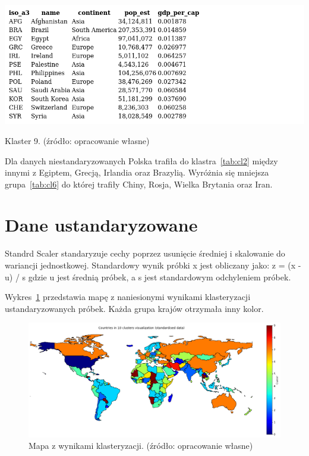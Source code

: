 \documentclass[11pt]{report}
\begin{document}
    \begin{table}[!htp]
        \centering
        \includegraphics[width=\linewidth]{tables/CLUST/clust9kmeans.png}
        \caption{Klaster 9. (źródło: opracowanie własne)}
        \label{tab:cl9}
    \end{table}

    Dla danych niestandaryzowanych Polska trafiła do klastra~\ref{tab:cl2} między innymi z Egiptem, Grecją, Irlandia oraz Brazylią.
    Wyróżnia się mniejsza grupa~\ref{tab:cl6} do której trafiły Chiny, Rosja, Wielka Brytania oraz Iran.


    \section{Dane ustandaryzowane}
    Standrd Scaler standaryzuje cechy poprzez usunięcie średniej i skalowanie do wariancji jednostkowej.
    Standardowy wynik próbki x jest obliczany jako:
    z = (x - u) / s
    gdzie u jest średnią próbek, a s jest standardowym odchyleniem próbek.

    Wykres~\ref{fig:clust10std} przedstawia mapę z naniesionymi wynikami klasteryzacji ustandaryzowanych próbek.
    Każda grupa krajów otrzymała inny kolor.

    \begin{figure}[!htp]
        \centering
        \includegraphics[width=\linewidth]{fig/CLUST/10clusterMap_std.png}
        \caption{Mapa z wynikami klasteryzacji. (źródło: opracowanie własne)}
        \label{fig:clust10std}
    \end{figure}
\end{document}
